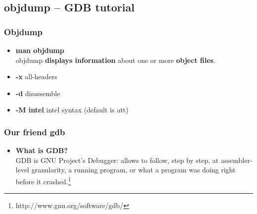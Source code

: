 \documentclass[]{beamer}
\begin{document}
\subsection{objdump -- GDB tutorial}
\begin{frame}
  \frametitle{Objdump}
  \begin{itemize}
  \item{{\bf man objdump}}\\
objdump \textbf{displays information} about one or more \textbf{object files}.
  \item{\textbf{-x}} all-headers
  \item{\textbf{-d}} disassemble
  \item{\textbf{-M intel}} intel syntax (default is att)
  \end{itemize}
\end{frame}

\begin{frame}
  \frametitle{Our friend gdb}
  \begin{itemize}
  \item{{\bf What is GDB?}}\\
    GDB is GNU Project's Debugger: allows to follow, step by step, at assembler-level granularity, a running program, or what a program was doing right before it crashed.\footnote{http://www.gnu.org/software/gdb/}
  \end{itemize}
\end{frame}
\end{document}
